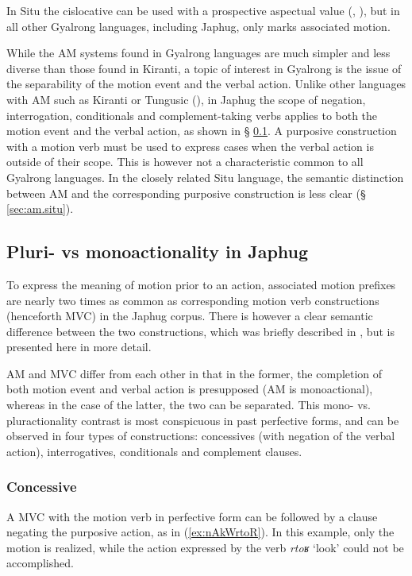 \documentclass[oneside,a4paper,11pt]{article}
\newcommand{\japhug}[2]{\textit{\phon#1} `#2'}
\begin{document}
In Situ the cislocative can be used with a prospective aspectual  value (\citealt{linyj03tense}, \citealt[204]{zhang16bragdbar}), but in all other Gyalrong languages, including Japhug, only marks associated motion.

While the AM systems found in Gyalrong languages are much simpler and less diverse than those found in Kiranti, a topic of interest in Gyalrong is the issue of the separability of the motion event and the verbal action. Unlike other languages with AM such as Kiranti or Tungusic (\citealt{stojnova16nda, fuente18am}), in Japhug the scope of negation, interrogation, conditionals and complement-taking verbs applies to both the motion event and the verbal action, as shown in § \ref{sec:am.japhug}. A purposive construction with a motion verb must be used to express cases when the verbal action is outside of their scope. This is however not a characteristic common to all Gyalrong languages. In the closely related Situ language, the semantic distinction between AM and the corresponding purposive construction is less clear (§ \ref{sec:am.situ}).

 \subsection{Pluri- vs monoactionality in Japhug} \label{sec:am.japhug}
To express the meaning of motion prior to an action, associated motion prefixes are nearly two times as common as corresponding motion verb constructions (henceforth MVC) in the Japhug corpus. There is however a clear semantic difference between the two constructions, which was briefly described in \citet{jacques13harmonization}, but is presented here in more detail.

AM and MVC differ from each other in that in the former, the completion of both motion event and verbal action is presupposed (AM is monoactional), whereas in the case of the latter, the two can be separated. This mono- vs. pluractionality contrast is most conspicuous in past perfective forms, and can be observed in four types of constructions: concessives (with negation of the verbal action), interrogatives, conditionals and complement clauses.

\subsubsection{Concessive} \label{sec:am.concessive}
A MVC  with the motion verb in perfective form can be followed by a clause negating the purposive action, as in (\ref{ex:nAkWrtoR}). In this example, only the motion is realized, while the action expressed by the verb \japhug{rtoʁ}{look} could not be accomplished.
\end{document}

